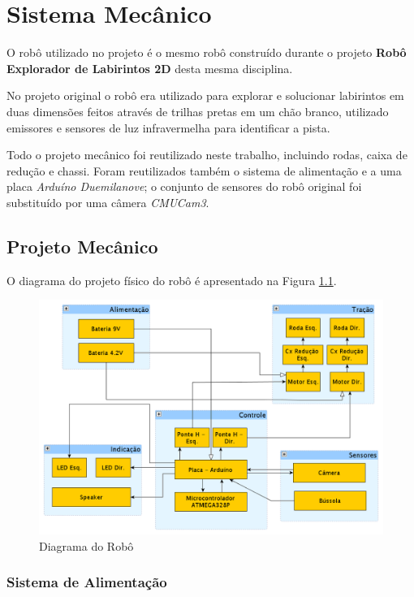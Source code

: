 \chapter{Sistema Mecânico}

O robô utilizado no projeto é o mesmo robô construído durante o projeto \textbf{Robô Explorador de Labirintos 2D} \cite{Robo2d} desta mesma disciplina.

No projeto original o robô era utilizado para explorar e solucionar labirintos em duas dimensões feitos através de trilhas pretas em um chão branco, utilizado emissores e sensores de luz infravermelha para identificar a pista. 

Todo o projeto mecânico foi reutilizado neste trabalho, incluindo rodas, caixa de redução e chassi. Foram reutilizados também o sistema de alimentação e a uma placa \textit{Arduíno Duemilanove}; o conjunto de sensores do robô original foi substituído por uma câmera \textit{CMUCam3}.

\section{Projeto Mecânico}

O diagrama do projeto físico do robô é apresentado na Figura \ref{int_fig01}.

\begin{figure}[h!]
    \center
    \includegraphics[scale=0.35]{imagens/robo_geral.png}
    \caption{Diagrama do Robô}
    \label{int_fig01}
\end{figure}

\subsection{Sistema de Alimentação}

